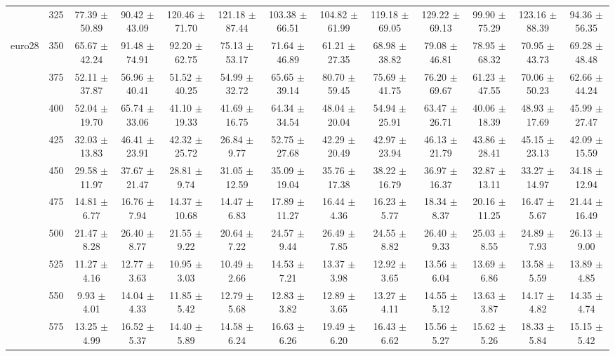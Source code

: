 \begin{table}[h]
{\begin{tabular}{
        ccccccccccccc}
 & 325& 77.39 $\pm$ 50.89& 90.42 $\pm$ 43.09& 120.46 $\pm$ 71.70& 121.18 $\pm$ 87.44& 103.38 $\pm$ 66.51& 104.82 $\pm$ 61.99& 119.18 $\pm$ 69.05& 129.22 $\pm$ 69.13& 99.90 $\pm$ 75.29& 123.16 $\pm$ 88.39& 94.36 $\pm$ 56.35 \\ 
\multirow{4}{*}{euro28}& 350& 65.67 $\pm$ 42.24& 91.48 $\pm$ 74.91& 92.20 $\pm$ 62.75& 75.13 $\pm$ 53.17& 71.64 $\pm$ 46.89& 61.21 $\pm$ 27.35& 68.98 $\pm$ 38.82& 79.08 $\pm$ 46.81& 78.95 $\pm$ 68.32& 70.95 $\pm$ 43.73& 69.28 $\pm$ 48.48 \\ 
 & 375& 52.11 $\pm$ 37.87& 56.96 $\pm$ 40.41& 51.52 $\pm$ 40.25& 54.99 $\pm$ 32.72& 65.65 $\pm$ 39.14& 80.70 $\pm$ 59.45& 75.69 $\pm$ 41.75& 76.20 $\pm$ 69.67& 61.23 $\pm$ 47.55& 70.06 $\pm$ 50.23& 62.66 $\pm$ 44.24 \\ 
 & 400& 52.04 $\pm$ 19.70& 65.74 $\pm$ 33.06& 41.10 $\pm$ 19.33& 41.69 $\pm$ 16.75& 64.34 $\pm$ 34.54& 48.04 $\pm$ 20.04& 54.94 $\pm$ 25.91& 63.47 $\pm$ 26.71& 40.06 $\pm$ 18.39& 48.93 $\pm$ 17.69& 45.99 $\pm$ 27.47 \\ 
 & 425& 32.03 $\pm$ 13.83& 46.41 $\pm$ 23.91& 42.32 $\pm$ 25.72& 26.84 $\pm$ 9.77& 52.75 $\pm$ 27.68& 42.29 $\pm$ 20.49& 42.97 $\pm$ 23.94& 46.13 $\pm$ 21.79& 43.86 $\pm$ 28.41& 45.15 $\pm$ 23.13& 42.09 $\pm$ 15.59 \\ 
 & 450& 29.58 $\pm$ 11.97& 37.67 $\pm$ 21.47& 28.81 $\pm$ 9.74& 31.05 $\pm$ 12.59& 35.09 $\pm$ 19.04& 35.76 $\pm$ 17.38& 38.22 $\pm$ 16.79& 36.97 $\pm$ 16.37& 32.87 $\pm$ 13.11& 33.27 $\pm$ 14.97& 34.18 $\pm$ 12.94 \\ 
 & 475& 14.81 $\pm$ 6.77& 16.76 $\pm$ 7.94& 14.37 $\pm$ 10.68& 14.47 $\pm$ 6.83& 17.89 $\pm$ 11.27& 16.44 $\pm$ 4.36& 16.23 $\pm$ 5.77& 18.34 $\pm$ 8.37& 20.16 $\pm$ 11.25& 16.47 $\pm$ 5.67& 21.44 $\pm$ 16.49 \\ 
 & 500& 21.47 $\pm$ 8.28& 26.40 $\pm$ 8.77& 21.55 $\pm$ 9.22& 20.64 $\pm$ 7.22& 24.57 $\pm$ 9.44& 26.49 $\pm$ 7.85& 24.55 $\pm$ 8.82& 26.40 $\pm$ 9.33& 25.03 $\pm$ 8.55& 24.89 $\pm$ 7.93& 26.13 $\pm$ 9.00 \\ 
 & 525& 11.27 $\pm$ 4.16& 12.77 $\pm$ 3.63& 10.95 $\pm$ 3.03& 10.49 $\pm$ 2.66& 14.53 $\pm$ 7.21& 13.37 $\pm$ 3.98& 12.92 $\pm$ 3.65& 13.56 $\pm$ 6.04& 13.69 $\pm$ 6.86& 13.58 $\pm$ 5.59& 13.89 $\pm$ 4.85 \\ 
 & 550& 9.93 $\pm$ 4.01& 14.04 $\pm$ 4.33& 11.85 $\pm$ 5.42& 12.79 $\pm$ 5.68& 12.83 $\pm$ 3.82& 12.89 $\pm$ 3.65& 13.27 $\pm$ 4.11& 14.55 $\pm$ 5.12& 13.63 $\pm$ 3.87& 14.17 $\pm$ 4.82& 14.35 $\pm$ 4.74 \\ 
 & 575& 13.25 $\pm$ 4.99& 16.52 $\pm$ 5.37& 14.40 $\pm$ 5.89& 14.58 $\pm$ 6.24& 16.63 $\pm$ 6.26& 19.49 $\pm$ 6.20& 16.43 $\pm$ 6.62& 15.56 $\pm$ 5.27& 15.62 $\pm$ 5.26& 18.33 $\pm$ 5.84& 15.15 $\pm$ 5.42 \\ 

\end{tabular}}
\end{table}
